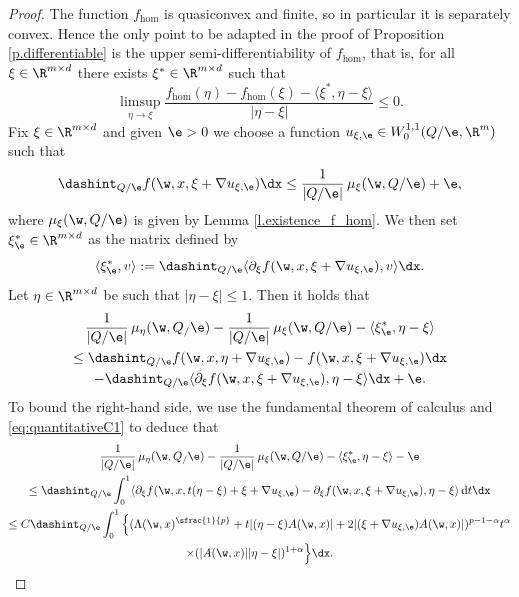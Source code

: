\begin{proof}
The function $f_{\hom}$ is quasiconvex and finite, so in particular it is separately convex. Hence the only point to be adapted in the proof of Proposition \ref{p.differentiable} is the upper semi-differentiability of $f_{\hom}$, that is, for all $\xi\in\R^{m\times d}$ there exists $\xi^*\in\R^{m\times d}$ such that
\begin{equation*}
\limsup_{\eta\to \xi}\frac{f_{\hom}(\eta)-f_{\hom}(\xi)-\langle\xi^*,\eta-\xi\rangle}{|\eta-\xi|}\leq 0.
\end{equation*}
Fix $\xi\in\R^{m\times d}$ and given $\e>0$ we choose a function $u_{\xi,\e}\in W^{1,1}_0(Q/\e,\R^m)$ such that
\begin{equation*}
\dashint_{Q/\e}f(\w,x,\xi+\nabla u_{\xi,\e})\dx\leq \frac{1}{|Q/\e|}\,\mu_{\xi}(\w,Q/\e)+\e,
\end{equation*}
where $\mu_{\xi}(\w,Q/\e)$ is given by Lemma \ref{l.existence_f_hom}. We then set $\xi^*_{\e}\in\R^{m\times d}$ as the matrix defined by
\begin{equation*}
\langle\xi_{\e}^*,v\rangle:= \dashint_{Q/\e}\langle\partial_{\xi}f(\w,x,\xi+\nabla u_{\xi,\e}),v\rangle\dx.
\end{equation*}
Let $\eta\in\R^{m\times d}$ be such that $|\eta-\xi|\leq 1$. Then it holds that
\begin{multline*}
\frac{1}{|Q/\e|}\,\mu_{\eta}(\w,Q_/\e)-\frac{1}{|Q/\e|}\,\mu_{\xi}(\w,Q/\e)-\langle\xi_{\e}^*,\eta-\xi\rangle
\\
\leq  \dashint_{Q/\e}f(\w,x,\eta+\nabla u_{\xi,\e})-f(\w,x,\xi+\nabla u_{\xi,\e})\dx
\\
-\dashint_{Q/\e}\langle\partial_{\xi}f(\w,x,\xi+\nabla u_{\xi,\e}),\eta-\xi\rangle\dx+\e.
\end{multline*}
To bound the right-hand side, we use the fundamental theorem of calculus and \eqref{eq:quantitativeC1} to deduce that
\begin{multline*}
\frac{1}{|Q/\e|}\,\mu_{\eta}(\w,Q_/\e)-\frac{1}{|Q/\e|}\,\mu_{\xi}(\w,Q/\e)-\langle\xi_{\e}^*,\eta-\xi\rangle-\e
\\
\leq \dashint_{Q/\e}\int_0^1\langle\partial_{\xi}f(\w,x,t(\eta-\xi)+\xi+\nabla u_{\xi,\e})-\partial_{\xi}f(\w,x,\xi+\nabla u_{\xi,\e}),\eta-\xi\rangle\,\mathrm{d}t\dx
\\
\leq C\dashint_{Q/\e}\int_0^1\Big\{(\Lambda(\w,x)^{\sfrac{1}{p}}+t|(\eta-\xi)A(\w,x)|+2|(\xi+\nabla u_{\xi,\e})A(\w,x)|)^{p-1-\alpha}t^{\alpha}
\\
\times (|A(\w,x)||\eta-\xi|)^{1+\alpha}\Big\}\dx.

\end{multline*}
\end{proof}
